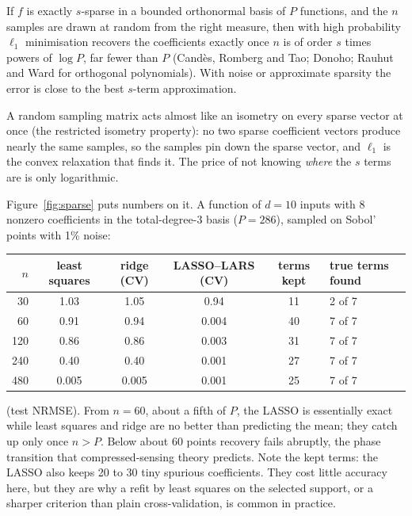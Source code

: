\begin{result}
If $f$ is exactly $s$-sparse in a bounded orthonormal basis of $P$ functions, and the $n$ samples are drawn at
random from the right measure, then with high probability $\ell_1$ minimisation recovers the coefficients exactly
once $n$ is of order $s$ times powers of $\log P$, far fewer than $P$ (Cand\`es, Romberg and Tao; Donoho; Rauhut
and Ward for orthogonal polynomials). With noise or approximate sparsity the error is close to the best $s$-term
approximation.
\end{result}
\begin{intuition}
A random sampling matrix acts almost like an isometry on every sparse vector at once (the restricted isometry
property): no two sparse coefficient vectors produce nearly the same samples, so the samples pin down the sparse
vector, and $\ell_1$ is the convex relaxation that finds it. The price of not knowing \emph{where} the $s$ terms
are is only logarithmic.
\end{intuition}

Figure~\ref{fig:sparse} puts numbers on it. A function of $d = 10$ inputs with 8 nonzero coefficients in the
total-degree-3 basis ($P = 286$), sampled on Sobol' points with 1\% noise:
\begin{center}
\small
\begin{tabular}{rccccl}
\toprule
$n$ & least squares & ridge (CV) & LASSO--LARS (CV) & terms kept & true terms found \\
\midrule
30  & 1.03  & 1.05  & 0.94  & 11 & 2 of 7 \\
60  & 0.91  & 0.94  & 0.004 & 40 & 7 of 7 \\
120 & 0.86  & 0.86  & 0.003 & 31 & 7 of 7 \\
240 & 0.40  & 0.40  & 0.001 & 27 & 7 of 7 \\
480 & 0.005 & 0.005 & 0.001 & 25 & 7 of 7 \\
\bottomrule
\end{tabular}
\end{center}
(test NRMSE). From $n = 60$, about a fifth of $P$, the LASSO is essentially exact while least squares and ridge
are no better than predicting the mean; they catch up only once $n > P$. Below about 60 points recovery fails
abruptly, the phase transition that compressed-sensing theory predicts. Note the kept terms: the LASSO also keeps
20 to 30 tiny spurious coefficients. They cost little accuracy here, but they are why a refit by least squares on
the selected support, or a sharper criterion than plain cross-validation, is common in practice.

